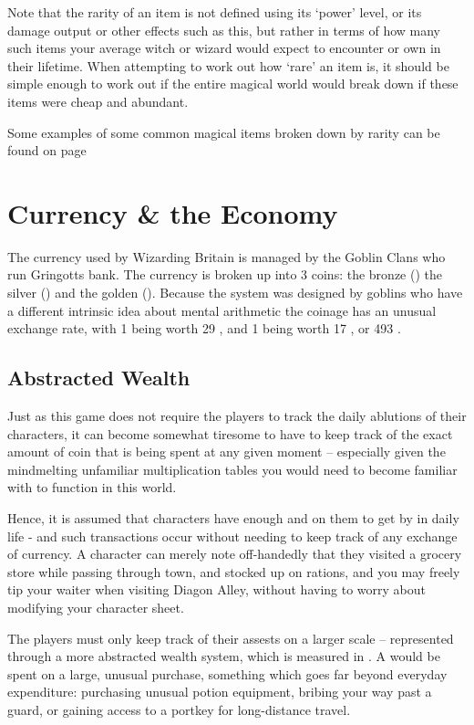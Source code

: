 Note that the rarity of an item is not defined using its `power' level, or its damage output or other effects such as this, but rather in terms of how many such items your average witch or wizard would expect to encounter or own in their lifetime. When attempting to work out how `rare' an item is, it should be simple enough to work out if the entire magical world would break down if these items were cheap and abundant. 

Some examples of some common magical items broken down by rarity can be found on page \pageref{E:EnchantingExamples}


\chapter{Currency \& the Economy} \label{S:Money}

The currency used by Wizarding Britain is managed by the Goblin Clans who run Gringotts bank. The currency is broken up into 3 coins: the bronze  (\knut{})\comma{} the silver  (\sickle{}) and the golden  (\galleon{}). Because the system was designed by goblins \minus{} who have a different intrinsic idea about mental arithmetic \minus{} the coinage has an unusual exchange rate, with 1  being worth 29 , and 1  being worth 17 , or 493 . 


\section{Abstracted Wealth}

Just as this game does not require the players to track the daily ablutions of their characters, it can become somewhat tiresome to have to keep track of the exact amount of coin that is being spent at any given moment -- especially given the mindmelting unfamiliar multiplication tables you would need to become familiar with to function in this world. 

Hence, it is assumed that characters have enough  and  on them to get by in daily life - and such transactions occur without needing to keep track of any exchange of currency. A character can merely note off-handedly that they visited a grocery store while passing through town, and stocked up on rations, and you may freely tip your waiter when visiting Diagon Alley, without having to worry about modifying your character sheet.

The players must only keep track of their assests on a larger scale -- represented through a more abstracted wealth system, which is measured in . A  would be spent on a large, unusual purchase, something which goes far beyond everyday expenditure: purchasing unusual potion equipment, bribing your way past a guard, or gaining access to a portkey for long-distance travel. 

